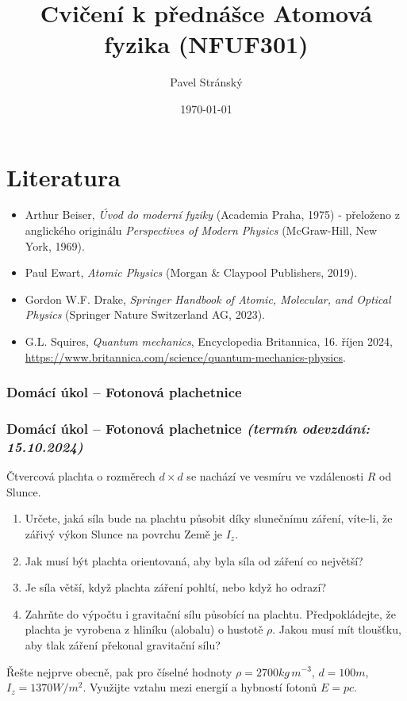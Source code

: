 \documentclass[a4paper,11pt,twoside]{article}
\newenvironment{homework}{}{}
\newcommand{\np}{\clearpage\newpage}
\newcommand{\exercise}[2][]{\ifthenelse{\isempty{#1}}
	{\np\thispagestyle{empty}\subsubsection*{Domácí úkol -- #2}}
	{\np\thispagestyle{empty}\np\subsubsection*{Domácí úkol -- #2 \small{\it{(termín odevzdání: {#1})}}}}
}
\begin{document}
\makeatletter
{}
\renewcommand{\theequation}{\arabic{section}.\arabic{subsection}.\arabic{equation}}
\makeatother

\title{Cvičení k přednášce Atomová fyzika (NFUF301)}
\date{\today}
\author{Pavel Stránský}

\maketitle
{}
\tableofcontents\np

\section*{Literatura}
\begin{itemize}
	\item Arthur Beiser, {\it Úvod do moderní fyziky} (Academia Praha, 1975) - přeloženo z anglického originálu {\it Perspectives of Modern Physics} (McGraw-Hill, New York, 1969).
	
	\item Paul Ewart, {\it Atomic Physics} (Morgan \& Claypool Publishers, 2019).
	
	\item Gordon W.F. Drake, {\it Springer Handbook of Atomic, Molecular, and Optical Physics} (Springer Nature Switzerland AG, 2023).

	\item G.L. Squires, {\it Quantum mechanics}, Encyclopedia Britannica, 16. říjen 2024, \url{https://www.britannica.com/science/quantum-mechanics-physics}.
\end{itemize}

\np
\np
\np
\np
\np
\np
\np
\np
\np
\np

\begin{homework}
\exercise[15.10.2024]{Fotonová plachetnice}
    Čtvercová plachta o rozměrech $d\times d$ se nachází ve vesmíru ve vzdálenosti $R$ od Slunce.
	\begin{enumerate}
		\item Určete, jaká síla bude na plachtu působit díky slunečnímu záření, víte-li, že zářivý výkon Slunce na povrchu Země je $I_{z}$.
		\item Jak musí být plachta orientovaná, aby byla síla od záření co největší?
		\item Je síla větší, když plachta záření pohltí, nebo když ho odrazí?
		\item Zahrňte do výpočtu i gravitační sílu působící na plachtu. 
			Předpokládejte, že plachta je vyrobena z hliníku (alobalu) o hustotě $\rho$.
			Jakou musí mít tloušťku, aby tlak záření překonal gravitační sílu?
	\end{enumerate}
	Řešte nejprve obecně, pak pro číselné hodnoty $\rho=2700\unit{kg\,m^{-3}}$, $d=100\unit{m}$, $I_z=1370\unit{W/m^{2}}$.
	Využijte vztahu mezi energií a hybností fotonů $E=pc$.    
\end{homework}
\end{document}
